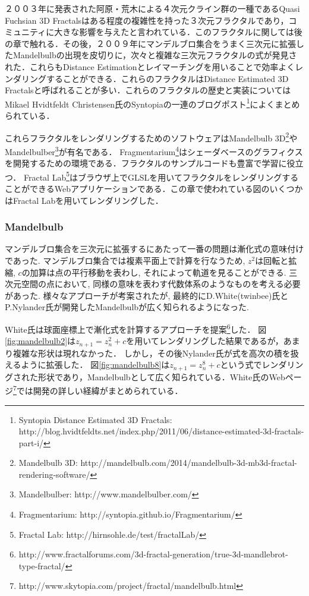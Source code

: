 ２００３年に発表された阿原・荒木\cite{sphairahedra}による４次元クライン群の一種であるQuasi Fuchsian 3D Fractalsはある程度の複雑性を持った３次元フラクタルであり，コミュニティに大きな影響を与えたと言われている．このフラクタルに関しては後の章で触れる．その後，２００９年にマンデルブロ集合をうまく三次元に拡張したMandelbulbの出現を皮切りに，次々と複雑な三次元フラクタルの式が発見された．これらもDistance Estimationとレイマーチングを用いることで効率よくレンダリングすることができる．これらのフラクタルはDistance Estimated 3D Fractalsと呼ばれることが多い．これらのフラクタルの歴史と実装についてはMikael Hvidtfeldt Christensen氏のSyntopiaの一連のブログポスト\footnote{Syntopia Distance Estimated 3D Fractals: http://blog.hvidtfeldts.net/index.php/2011/06/distance-estimated-3d-fractals-part-i/}によくまとめられている．

これらフラクタルをレンダリングするためのソフトウェアはMandelbulb 3D\footnote{Mandelbulb 3D: http://mandelbulb.com/2014/mandelbulb-3d-mb3d-fractal-rendering-software/}やMandelbulber\footnote{Mandelbulber: http://www.mandelbulber.com/}が有名である．
Fragmentarium\footnote{Fragmentarium: http://syntopia.github.io/Fragmentarium/}はシェーダベースのグラフィクスを開発するための環境である．フラクタルのサンプルコードも豊富で学習に役立つ．
Fractal Lab\footnote{Fractal Lab: http://hirnsohle.de/test/fractalLab/}はブラウザ上でGLSLを用いてフラクタルをレンダリングすることができるWebアプリケーションである．この章で使われている図のいくつかはFractal Labを用いてレンダリングした．

\subsubsection{Mandelbulb}

マンデルブロ集合を三次元に拡張するにあたって一番の問題は漸化式の意味付けであった.
マンデルブロ集合では複素平面上で計算を行なうため, $z^2$は回転と拡縮, $c$の加算は点の平行移動を表わし, それによって軌道を見ることができる. 
三次元空間の点において, 同様の意味を表わす代数体系のようなものを考える必要があった. 
様々なアプローチが考案されたが, 最終的にD.White(twinbee)氏とP.Nylander氏が開発したMandelbulbが広く知られるようになった. 

White氏は球面座標上で漸化式を計算するアプローチを提案\footnote{http://www.fractalforums.com/3d-fractal-generation/true-3d-mandlebrot-type-fractal/}した．
図\ref{fig:mandelbulb2}は$z_{n+1} = z_n^2 + c$を用いてレンダリングした結果であるが，あまり複雑な形状は現れなかった．
しかし，その後Nylander氏が式を高次の積を扱えるように拡張した．
図\ref{fig:mandelbulb8}は$z_{n+1} = z_n^8 + c $という式でレンダリングされた形状であり，Mandelbulbとして広く知られている．White氏のWebページ\footnote{http://www.skytopia.com/project/fractal/mandelbulb.html}では開発の詳しい経緯がまとめられている．


